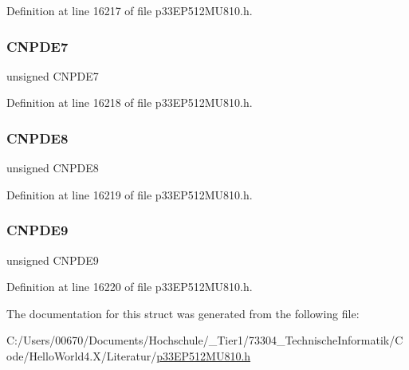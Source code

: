 Definition at line 16217 of file p33\+E\+P512\+M\+U810.\+h.

\mbox{\label{structtag_c_n_p_d_e_b_i_t_s_a2d4e2599c4fb26aad54f292ff3ff49fa}} 
\subsubsection{\texorpdfstring{C\+N\+P\+D\+E7}{CNPDE7}}
{\footnotesize\ttfamily unsigned C\+N\+P\+D\+E7}



Definition at line 16218 of file p33\+E\+P512\+M\+U810.\+h.

\mbox{\label{structtag_c_n_p_d_e_b_i_t_s_aa669b8dd88872dce970315081dba4c7e}} 
\subsubsection{\texorpdfstring{C\+N\+P\+D\+E8}{CNPDE8}}
{\footnotesize\ttfamily unsigned C\+N\+P\+D\+E8}



Definition at line 16219 of file p33\+E\+P512\+M\+U810.\+h.

\mbox{\label{structtag_c_n_p_d_e_b_i_t_s_a4a1972626e351660a88e9bdb1058de80}} 
\subsubsection{\texorpdfstring{C\+N\+P\+D\+E9}{CNPDE9}}
{\footnotesize\ttfamily unsigned C\+N\+P\+D\+E9}



Definition at line 16220 of file p33\+E\+P512\+M\+U810.\+h.



The documentation for this struct was generated from the following file\+:\begin{DoxyCompactItemize}
\item 
C\+:/\+Users/00670/\+Documents/\+Hochschule/\+\_\+\+Tier1/73304\+\_\+\+Technische\+Informatik/\+Code/\+Hello\+World4.\+X/\+Literatur/\hyperlink{p33_e_p512_m_u810_8h}{p33\+E\+P512\+M\+U810.\+h}\end{DoxyCompactItemize}

